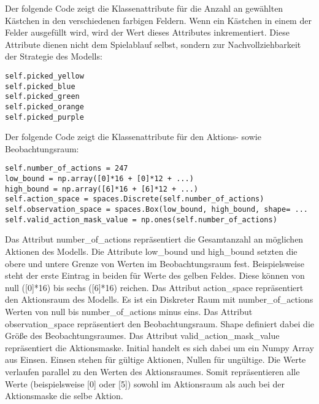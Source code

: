 \begin{minipage}{\linewidth}
Der folgende Code zeigt die Klassenattribute für die Anzahl an gewählten Kästchen in den verschiedenen farbigen Feldern. Wenn ein Kästchen in einem der Felder ausgefüllt wird, wird der Wert dieses Attributes inkrementiert. Diese Attribute dienen nicht dem Spielablauf selbst, sondern zur Nachvollziehbarkeit der Strategie des Modells:
\vspace{0.5cm}
\begin{lstlisting}[caption={Klassenattribute für gewählte Kästchen in den farbigen Feldern}]
self.picked_yellow
self.picked_blue
self.picked_green
self.picked_orange
self.picked_purple
\end{lstlisting}
\end{minipage}

\begin{minipage}{\linewidth}
Der folgende Code zeigt die Klassenattribute für den Aktions- sowie Beobachtungsraum:
\vspace{0.5cm}
\begin{lstlisting}[caption={Klassenattribute Aktionsraum und Beobachtungsraum}]
self.number_of_actions = 247
low_bound = np.array([0]*16 + [0]*12 + ...)
high_bound = np.array([6]*16 + [6]*12 + ...)
self.action_space = spaces.Discrete(self.number_of_actions)
self.observation_space = spaces.Box(low_bound, high_bound, shape= ...
self.valid_action_mask_value = np.ones(self.number_of_actions)
\end{lstlisting}
\end{minipage}

Das Attribut number\_of\_actions repräsentiert die Gesamtanzahl an möglichen Aktionen des Modells. Die Attribute low\_bound und high\_bound setzten die obere und untere Grenze von Werten im Beobachtungsraum fest. Beispielsweise steht der erste Eintrag in beiden für Werte des gelben Feldes. Diese können von null ([0]*16) bis sechs ([6]*16) reichen. Das Attribut action\_space repräsentiert den Aktionsraum des Modells. Es ist ein Diskreter Raum mit number\_of\_actions Werten von null bis number\_of\_actions minus eins. Das Attribut observation\_space repräsentiert den Beobachtungsraum. Shape definiert dabei die Größe des Beobachtungsraumes. Das Attribut valid\_action\_mask\_value repräsentiert die Aktionsmaske. Initial handelt es sich dabei um ein Numpy Array aus Einsen. Einsen stehen für gültige Aktionen, Nullen für ungültige. Die Werte verlaufen parallel zu den Werten des Aktionsraumes. Somit repräsentieren alle Werte (beispielsweise [0] oder [5]) sowohl im Aktionsraum als auch bei der Aktionsmaske die selbe Aktion.\\

